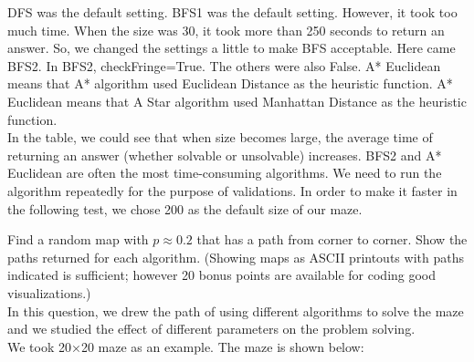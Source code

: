 \documentclass[letter]{article}
\begin{document}
\begin{questions}
	DFS was the default setting. BFS1 was the default setting. However, it took too much time. When the size was 30, it took more than 250 seconds to return an answer. So, we changed the settings a little to make BFS acceptable. Here came BFS2. In BFS2, checkFringe=True. The others were also False. A* Euclidean means that A* algorithm used Euclidean Distance as the heuristic function. A* Euclidean means that A Star algorithm used Manhattan Distance as the heuristic function. \\
	
	In the table, we could see that when size becomes large, the average time of returning an answer (whether solvable or unsolvable) increases. BFS2 and A* Euclidean are often the most time-consuming algorithms. We need to run the algorithm repeatedly for the purpose of validations. In order to make it faster in the following test, we chose 200 as the default size of our maze. \\
	
	\item {Find a random map with $ p \approx 0.2 $ that has a path from corner to corner. Show the paths returned for each algorithm. (Showing maps as ASCII printouts with paths indicated is sufficient; however 20 bonus points are available for coding good visualizations.)} \\
	
	In this question, we drew the path of using different algorithms to solve the maze and we studied the effect of different parameters on the problem solving. \\
	We took 20×20 maze as an example. The maze is shown below: \\
	

\end{questions}
\end{document}
